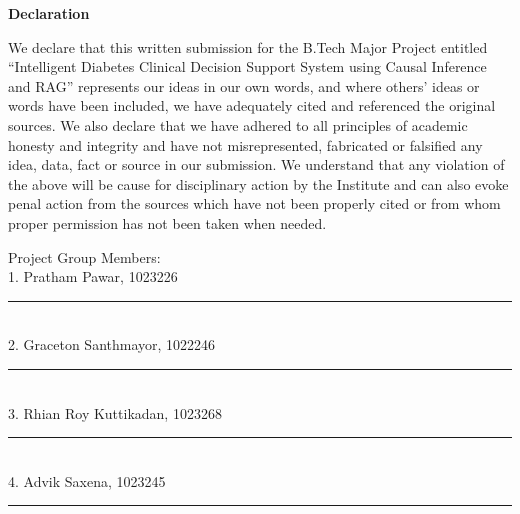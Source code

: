 \begin{center}{\LARGE\bf Declaration}\end{center}
\justify
We declare that this written submission for the B.Tech Major Project entitled ``Intelligent Diabetes Clinical Decision Support System using Causal Inference and RAG'' represents our ideas in our own words, and where others' ideas or words have been included, we have adequately cited and referenced the original sources. We also declare that we have adhered to all principles of academic honesty and integrity and have not misrepresented, fabricated or falsified any idea, data, fact or source in our submission. We understand that any violation of the above will be cause for disciplinary action by the Institute and can also evoke penal action from the sources which have not been properly cited or from whom proper permission has not been taken when needed.
\vspace{1.5cm}
\begin{flushright}
Project Group Members:\\[0.5cm]
1. Pratham Pawar, 1023226 \quad \rule{3.5cm}{0.4pt}\\[0.6cm]
2. Graceton Santhmayor, 1022246 \quad \rule{3.5cm}{0.4pt}\\[0.6cm]
3. Rhian Roy Kuttikadan, 1023268 \quad \rule{3.5cm}{0.4pt}\\[0.6cm]
4. Advik Saxena, 1023245 \quad \rule{3.5cm}{0.4pt}
\end{flushright}
